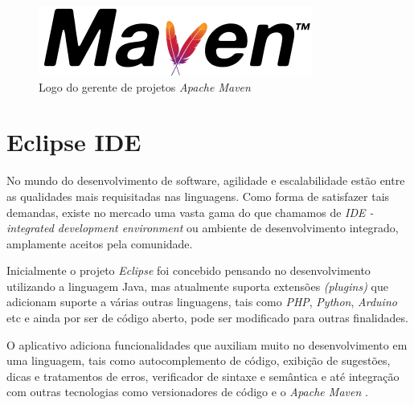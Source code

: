 \documentclass[
	12pt,			%
	openright,		%
	oneside,	
	a4paper,		%
	english,		%
	brazil			%
]{abntex2/abntex2}  %
\begin{document}
			\begin{figure}[h]
				\begin{center}
					
					\caption{Logo do gerente de projetos \textit{Apache Maven}}
					\label{maven-img}
				
					\includegraphics[scale=0.5]{img/maven-logo}
					
					
				\end{center}
			\end{figure}

		\section{Eclipse IDE} \label{eclipse-ide}
		
			No mundo do desenvolvimento de software, agilidade e escalabilidade estão entre as qualidades mais requisitadas nas linguagens. Como forma de satisfazer tais demandas, existe no mercado uma vasta gama do que chamamos de \textit{IDE - integrated development environment} ou ambiente de desenvolvimento integrado, amplamente aceitos pela comunidade.
			
			Inicialmente o projeto \textit{Eclipse} \cite{eclipse} foi concebido pensando no desenvolvimento utilizando a linguagem Java, mas atualmente suporta extensões \textit{(plugins)} que adicionam suporte a várias outras linguagens, tais como \textit{PHP}, \textit{Python}, \textit{Arduino} etc e ainda por ser de código aberto, pode ser modificado para outras finalidades.
			
			O aplicativo adiciona funcionalidades que auxiliam muito no desenvolvimento em uma linguagem, tais como autocomplemento de código, exibição de sugestões, dicas e tratamentos de erros, verificador de sintaxe e semântica e até integração com outras tecnologias como versionadores de código e o \textit{Apache Maven} \cite{maven}.
\end{document}
